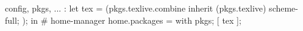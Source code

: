 { config, pkgs, ... }:
let
  tex = (pkgs.texlive.combine {
    inherit (pkgs.texlive) scheme-full;
  });
in
{ # home-manager
  home.packages = with pkgs; [
    tex
  ];
}
